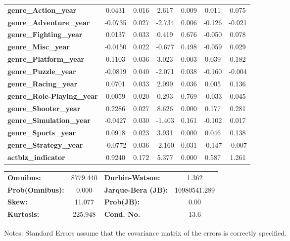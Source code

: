 \documentclass{report}
\begin{document}
\begin{center}
\begin{tabular}{lcccccc}
\textbf{genre\_Action\_year}       &       0.0431  &        0.016     &     2.617  &         0.009        &        0.011    &        0.075     \\
\textbf{genre\_Adventure\_year}    &      -0.0735  &        0.027     &    -2.734  &         0.006        &       -0.126    &       -0.021     \\
\textbf{genre\_Fighting\_year}     &       0.0137  &        0.033     &     0.419  &         0.676        &       -0.050    &        0.078     \\
\textbf{genre\_Misc\_year}         &      -0.0150  &        0.022     &    -0.677  &         0.498        &       -0.059    &        0.029     \\
\textbf{genre\_Platform\_year}     &       0.1103  &        0.036     &     3.023  &         0.003        &        0.039    &        0.182     \\
\textbf{genre\_Puzzle\_year}       &      -0.0819  &        0.040     &    -2.071  &         0.038        &       -0.160    &       -0.004     \\
\textbf{genre\_Racing\_year}       &       0.0701  &        0.033     &     2.099  &         0.036        &        0.005    &        0.136     \\
\textbf{genre\_Role-Playing\_year} &       0.0059  &        0.020     &     0.293  &         0.769        &       -0.033    &        0.045     \\
\textbf{genre\_Shooter\_year}      &       0.2286  &        0.027     &     8.626  &         0.000        &        0.177    &        0.281     \\
\textbf{genre\_Simulation\_year}   &      -0.0427  &        0.030     &    -1.403  &         0.161        &       -0.102    &        0.017     \\
\textbf{genre\_Sports\_year}       &       0.0918  &        0.023     &     3.931  &         0.000        &        0.046    &        0.138     \\
\textbf{genre\_Strategy\_year}     &      -0.0772  &        0.036     &    -2.160  &         0.031        &       -0.147    &       -0.007     \\
\textbf{actblz\_indicator}         &       0.9240  &        0.172     &     5.377  &         0.000        &        0.587    &        1.261     \\
\bottomrule
\end{tabular}
\begin{tabular}{lclc}
\textbf{Omnibus:}       & 8779.440 & \textbf{  Durbin-Watson:     } &      1.362    \\
\textbf{Prob(Omnibus):} &   0.000  & \textbf{  Jarque-Bera (JB):  } & 10980541.289  \\
\textbf{Skew:}          &  11.077  & \textbf{  Prob(JB):          } &       0.00    \\
\textbf{Kurtosis:}      & 225.948  & \textbf{  Cond. No.          } &       13.6    \\
\bottomrule
\end{tabular}
\end{center}

Notes: \newline
 [1] Standard Errors assume that the covariance matrix of the errors is correctly specified.
\end{document}
